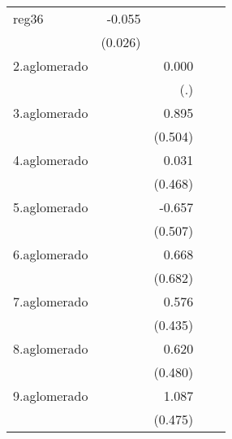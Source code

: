 {\begin{longtable}{l*{4}{D{.}{.}{-1}}}
\addlinespace
reg36       &      -0.055\sym{*}  &                     &                     &                     \\
            &     (0.026)         &                     &                     &                     \\
\addlinespace
2.aglomerado&                     &       0.000         &                     &                     \\
            &                     &         (.)         &                     &                     \\
\addlinespace
3.aglomerado&                     &       0.895         &                     &                     \\
            &                     &     (0.504)         &                     &                     \\
\addlinespace
4.aglomerado&                     &       0.031         &                     &                     \\
            &                     &     (0.468)         &                     &                     \\
\addlinespace
5.aglomerado&                     &      -0.657         &                     &                     \\
            &                     &     (0.507)         &                     &                     \\
\addlinespace
6.aglomerado&                     &       0.668         &                     &                     \\
            &                     &     (0.682)         &                     &                     \\
\addlinespace
7.aglomerado&                     &       0.576         &                     &                     \\
            &                     &     (0.435)         &                     &                     \\
\addlinespace
8.aglomerado&                     &       0.620         &                     &                     \\
            &                     &     (0.480)         &                     &                     \\
\addlinespace
9.aglomerado&                     &       1.087\sym{*}  &                     &                     \\
            &                     &     (0.475)         &                     &                     \\

\end{longtable}}
